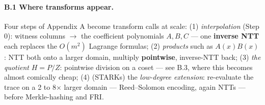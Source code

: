 \documentclass[10pt]{article}
\begin{document}
\paragraph{B.1 Where transforms appear.} Four steps of Appendix A
become transform calls at scale: (1) \emph{interpolation} (Step 0):
witness columns $\to$ the coefficient polynomials $A, B, C$ --- one
\textbf{inverse NTT} each replaces the $O(m^2)$ Lagrange formulas;
(2) \emph{products} such as $A(x)B(x)$: NTT both onto a larger
domain, multiply \textbf{pointwise}, inverse-NTT back; (3)
\emph{the quotient} $H = P/Z$: pointwise division on a coset ---
see B.3, where this becomes almost comically cheap; (4) (STARKs)
the \emph{low-degree extension}: re-evaluate the trace on a
2 to 8$\times$ larger domain --- Reed--Solomon encoding, again NTTs
--- before Merkle-hashing and FRI.
\end{document}

